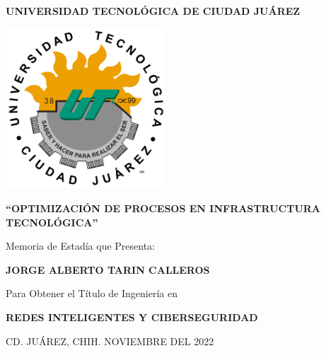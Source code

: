 \begin{titlepage}
    \centering
    
    {\fontsize{28}{34}\selectfont\textbf{UNIVERSIDAD TECNOLÓGICA DE CIUDAD JUÁREZ}\par}
    \vspace{1cm}

    \includegraphics[width=6cm,height=6cm]{Images/ESCUDO_UTCJ2014_02.jpg}\par
    \vspace{1cm}

    {\fontsize{14}{18}\selectfont\textbf{``OPTIMIZACIÓN DE PROCESOS EN INFRASTRUCTURA TECNOLÓGICA''}\par} %
    \vspace{0.5cm}

    {\fontsize{16}{20}\selectfont Memoria de Estadía que Presenta:\par}
    \vspace{0.5cm}

    {\fontsize{20}{24}\selectfont\textbf{JORGE ALBERTO TARIN CALLEROS}\par}
    \vspace{1cm}

    {\fontsize{16}{20}\selectfont Para Obtener el Título de Ingeniería en\par}
    \vspace{0.5cm}

    {\fontsize{18}{22}\selectfont\textbf{REDES INTELIGENTES Y CIBERSEGURIDAD}\par}

    \vfill %

    \flushleft
    {\fontsize{14}{18}\selectfont CD. JUÁREZ, CHIH.}%
    \hfill
    {\fontsize{14}{18}\selectfont NOVIEMBRE DEL 2022} %

\end{titlepage}